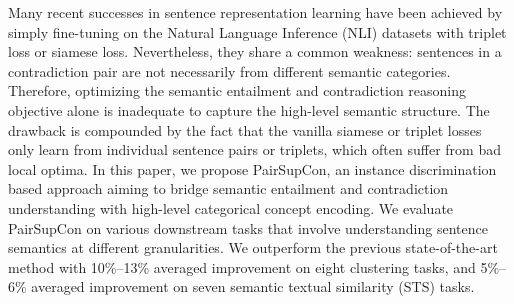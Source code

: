 Many recent successes in sentence representation learning have been achieved by simply fine-tuning on the Natural Language Inference (NLI) datasets with triplet loss or siamese loss. Nevertheless, they share a common weakness: sentences in a contradiction pair are not necessarily from different semantic categories. Therefore, optimizing the semantic entailment and contradiction reasoning objective alone is inadequate to capture the high-level semantic structure. The drawback is compounded by the fact that the vanilla siamese or triplet losses only learn from individual sentence pairs or triplets, which often suffer from bad local optima. In this paper, we propose PairSupCon, an instance discrimination based approach aiming to bridge semantic entailment and contradiction understanding with high-level categorical concept encoding. We evaluate PairSupCon on various downstream tasks that involve understanding sentence semantics at different granularities. We outperform the previous state-of-the-art method with 10\%--13\% averaged improvement on eight clustering tasks, and 5\%--6\% averaged improvement on seven semantic textual similarity (STS) tasks.
